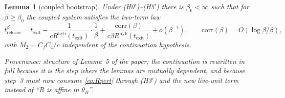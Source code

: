 \documentclass[11pt]{article}
\newtheorem{lemma}{Lemma}
\theoremstyle{definition}
\theoremstyle{remark}
\newcommand{\hyb}{\mathrm{hyb}}
\newcommand{\texit}{t_{\mathrm{exit}}}
\begin{document}
\begin{lemma}[coupled bootstrap]\label{lem:bootstrap}
Under \textup{(H0$'$)--(H5$'$)} there is $\beta_0<\infty$ such that for
$\beta\ge\beta_0$ the coupled system satisfies the two-term law
\begin{equation}\label{eq:twoterm}
t^\beta_{\mathrm{release}}
=\texit-\frac{1}{cR^{\hyb}(\texit)}\cdot\frac1\beta
+\frac{\mathrm{corr}(\beta)}{c\beta R^{\hyb}(\texit)}+o(\beta^{-1}),
\qquad \mathrm{corr}(\beta)=O(\log\beta/\beta),
\end{equation}
with $M_2=C_fC_4/c$ independent of the continuation hypothesis.
\end{lemma}

\noindent\emph{Provenance: structure of Lemma~5 of the paper; the continuation is
rewritten in full because it is the step where the lemmas are mutually
dependent, and because step~3 must now consume \eqref{eq:Rpert} through
(H3$'$) and the new live-unit term instead of ``$R$ is affine in $\theta_B$''.}
\end{document}
